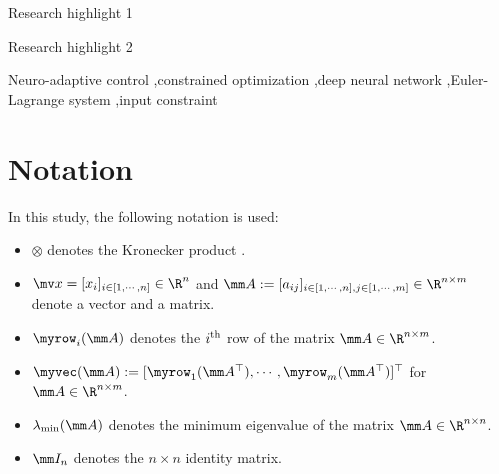 \documentclass[final,5p,times,twocolumn,authoryear]{elsarticle}
\begin{document}
\begin{frontmatter}
\begin{graphicalabstract}
\end{graphicalabstract}

\begin{highlights}
\item Research highlight 1
\item Research highlight 2
\end{highlights}

\begin{keyword}
Neuro-adaptive control \sep constrained optimization \sep deep neural network \sep Euler-Lagrange system \sep input constraint



\end{keyword}

\end{frontmatter}




\section*{Notation}
In this study, the following notation is used:

\begin{itemize}
    \item $\otimes$ denotes the Kronecker product \cite[Definition 7.1.2]{Bernstein:2009aa}.
    \item $\mv x=[x_i]_{i\in[1,\cdots,n]}\in\R^n$ and $
        \mm A
        := 
        [a_{ij}]
        _{
            i\in[1,\cdots,n],j\in[1,\cdots ,m]
        }\allowbreak\in\R^{n\times m}
        $ denote a vector and a matrix.
    \item $\myrow_i(\mm A)$ denotes the $i\textsuperscript{th}$ row of the matrix $\mm A\in\R^{n\times m}$. 
    \item $\myvec(\mm A):= [\myrow_1(\mm A^\top)  ,\cdots,\myrow_m(\mm A^\top)  ]^\top   $ for $\mm A\in\R^{n\times m}$.
    \item $\lambda_{\min}(\mm A)$ denotes the minimum eigenvalue of the matrix $\mm A\in\R^{n\times n}$.
    \item $\mm I_n$ denotes the $n\times n$ identity matrix.
\end{itemize}
\end{document}
